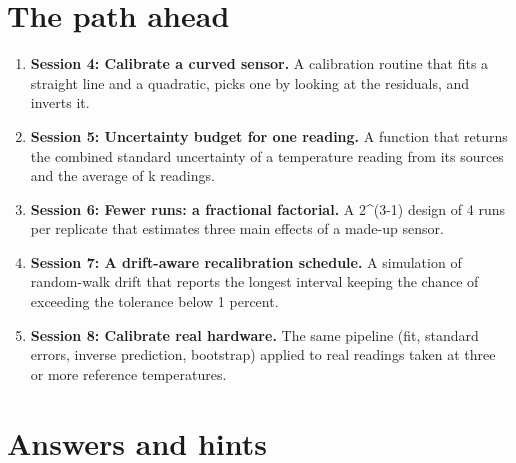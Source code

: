 \documentclass[11pt,a4paper]{article}
\begin{document}
\section{The path ahead}
\begin{enumerate}[nosep]
\item \textbf{Session 4: Calibrate a curved sensor.} A calibration routine that fits a straight line and a quadratic, picks one by looking at the residuals, and inverts it.
\item \textbf{Session 5: Uncertainty budget for one reading.} A function that returns the combined standard uncertainty of a temperature reading from its sources and the average of k readings.
\item \textbf{Session 6: Fewer runs: a fractional factorial.} A 2\textasciicircum{}(3-1) design of 4 runs per replicate that estimates three main effects of a made-up sensor.
\item \textbf{Session 7: A drift-aware recalibration schedule.} A simulation of random-walk drift that reports the longest interval keeping the chance of exceeding the tolerance below 1 percent.
\item \textbf{Session 8: Calibrate real hardware.} The same pipeline (fit, standard errors, inverse prediction, bootstrap) applied to real readings taken at three or more reference temperatures.
\end{enumerate}

\section{Answers and hints}
\end{document}
